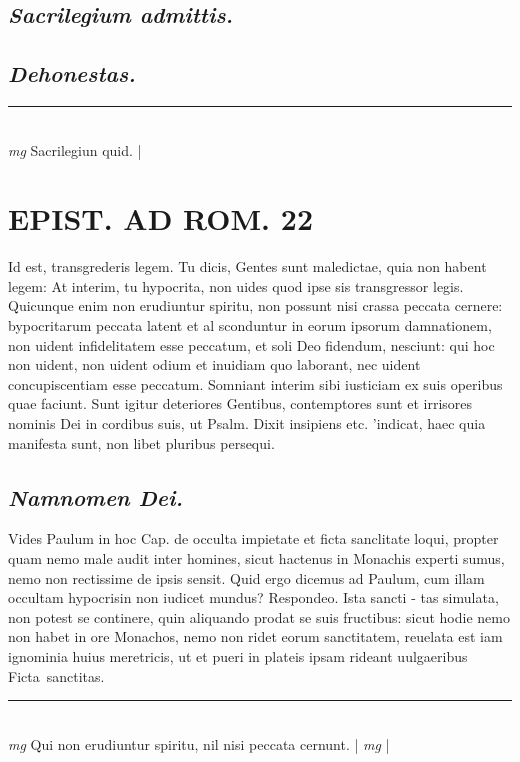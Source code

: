 \documentclass{article}
\begin{document}
\begin{pages}
\subsection*{\textit{Sacrilegium admittis. }}
{}
\subsection*{\textit{Dehonestas. }}
\vspace{0.5cm}\noindent
\vspace{0.2cm}\rule{1cm}{0.2pt}\\ 
\hspace{0.2cm}\textit{mg}
\footnotesize Sacrilegiun quid.  
\normalsize| 
\section*{EPIST. AD ROM.  22 }
\marginpar{[ p.]}\pstart Id est, transgrederis legem. Tu dicis, Gentes sunt maledictae, quia non habent legem: At interim, tu hypocrita, non uides quod ipse sis transgressor legis.  Quicunque enim non erudiuntur spiritu, non possunt nisi crassa peccata cernere: bypocritarum peccata latent et al sconduntur in eorum ipsorum damnationem, non uident infidelitatem esse peccatum, et soli Deo fidendum, nesciunt: qui hoc non uident, non uident odium et inuidiam quo laborant, nec uident concupiscentiam esse peccatum. Somniant interim sibi iusticiam ex suis operibus quae faciunt. Sunt igitur deteriores Gentibus, contemptores sunt et irrisores nominis Dei in cordibus suis, ut Psalm. Dixit insipiens etc. 'indicat, haec quia manifesta sunt, non libet pluribus persequi.   \pend
{}
{}
\subsection*{\textit{Namnomen Dei. }}\pstart Vides Paulum in hoc Cap. de occulta impietate et ficta sanclitate loqui, propter quam nemo male audit inter homines, sicut hactenus in Monachis experti sumus, nemo non rectissime de ipsis sensit. Quid ergo dicemus ad Paulum, cum illam occultam hypocrisin non iudicet mundus? Respondeo. Ista sancti - tas simulata, non potest se continere, quin aliquando prodat se suis fructibus: sicut hodie nemo non habet in ore Monachos, nemo non ridet eorum sanctitatem, reuelata est iam ignominia huius meretricis, ut et pueri in plateis ipsam rideant uulgaeribus Ficta sanctitas.   \pend
\vspace{0.5cm}\noindent
\vspace{0.2cm}\rule{1cm}{0.2pt}\\ 
\hspace{0.2cm}\textit{mg}
\footnotesize Qui non erudiuntur spiritu, nil nisi peccata cernunt.  
\normalsize| 
\hspace{0.2cm}\textit{mg}
\footnotesize 
\normalsize| 

\end{pages}
\end{document}
